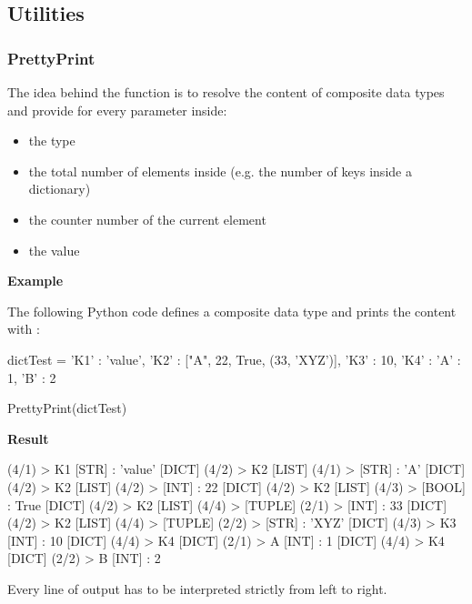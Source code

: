 \newpage

\subsection{Utilities}

\subsubsection{PrettyPrint}

The idea behind the  function is to resolve the content of composite data types and provide for every parameter inside:

\begin{itemize}
   \item the type
   \item the total number of elements inside (e.g. the number of keys inside a dictionary)
   \item the counter number of the current element
   \item the value
\end{itemize}

\textbf{Example}

The following Python code defines a composite data type and prints the content with :

\begin{pythoncode}
dictTest = {'K1' : 'value',
            'K2' : ["A", 22, True, (33, 'XYZ')],
            'K3' : 10,
            'K4' : {'A' : 1,
                    'B' : 2}}

PrettyPrint(dictTest)
\end{pythoncode}

\textbf{Result}

\begin{pythonlog}
[DICT] (4/1) > {K1} [STR]  :  'value'
[DICT] (4/2) > {K2} [LIST] (4/1) > [STR]  :  'A'
[DICT] (4/2) > {K2} [LIST] (4/2) > [INT]  :  22
[DICT] (4/2) > {K2} [LIST] (4/3) > [BOOL]  :  True
[DICT] (4/2) > {K2} [LIST] (4/4) > [TUPLE] (2/1) > [INT]  :  33
[DICT] (4/2) > {K2} [LIST] (4/4) > [TUPLE] (2/2) > [STR]  :  'XYZ'
[DICT] (4/3) > {K3} [INT]  :  10
[DICT] (4/4) > {K4} [DICT] (2/1) > {A} [INT]  :  1
[DICT] (4/4) > {K4} [DICT] (2/2) > {B} [INT]  :  2
\end{pythonlog}

Every line of output has to be interpreted strictly from left to right.

